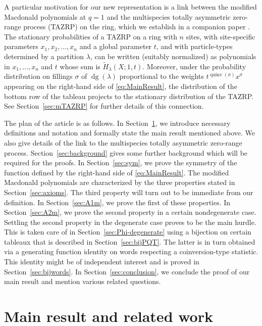 \documentclass[11pt]{article}
\theoremstyle{definition}
\numberwithin{equation}{section}
\DeclareMathOperator{\dg}{dg}
\DeclareMathOperator{\quinv}{quinv}
\begin{document}
A particular motivation for our new representation is a link between the modified Macdonald polynomials at $q=1$ and the multispecies totally asymmetric zero-range process (TAZRP) on the ring, which we establish in a companion paper \cite{AMM22}. 
The stationary probabilities of a TAZRP on a ring with $n$ sites, with site-specific 
parameters $x_1, x_2, \dots, x_n$ and a global parameter $t$, and with
particle-types determined by a partition $\lambda$, 
can be written (suitably normalized) as polynomials in $x_1,\dots, x_n$ and $t$ whose 
sum is $\widetilde{H}_{\lambda}(X;1,t)$. Moreover, under
the probability distribution on fillings $\sigma$ of $\dg(\lambda)$ 
proportional to the weights $t^{\quinv(\sigma)} x^\sigma$ appearing on the right-hand side
of \eqref{eq:MainResult}, the distribution of the bottom row of the tableau 
projects to the stationary distribution of the TAZRP. 
See Section~\ref{sec:mTAZRP} for further details of this connection. 


The plan of the article is as follows. In Section~\ref{sec:main}, we introduce necessary definitions and notation and formally state the main result mentioned above. We also give details of the link to the multispecies totally asymmetric zero-range process. Section~\ref{sec:background} gives some further background which will be required for the proofs. In Section~\ref{sec:sym}, we prove the symmetry of the function defined by 
the right-hand side of \eqref{eq:MainResult}. The modified Macdonald polynomials are characterized by the three properties stated in Section~\ref{sec:axioms}. The third property will turn out to be immediate from our definition. In Section~\ref{sec:A1m}, we prove the first of these properties. In Section~\ref{sec:A2m}, we prove the second property in a certain nondegenerate case. Settling the second property in the degenerate case proves to be the main hurdle. This is taken care of in Section~\ref{sec:Phi-degenerate} using a bijection on certain tableaux that is described in Section~\ref{sec:bijPQT}. The latter is in turn obtained via a generating function identity on words respecting a coinversion-type statistic. This identity might be of independent interest and is proved in Section~\ref{sec:bijwords}. In Section~\ref{sec:conclusion}, we conclude the proof of our main result and mention various related questions.

\section{Main result and related work}
\label{sec:main}
\end{document}
